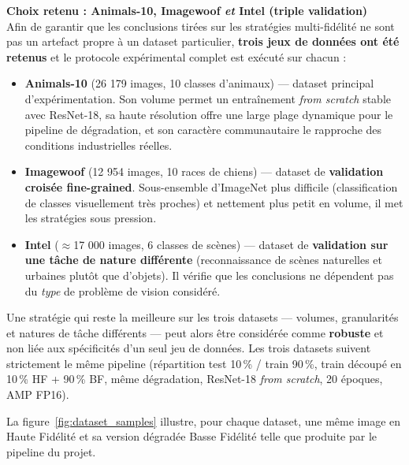 \documentclass[11pt,a4paper,openany]{book}
\begin{document}
\vspace{0.8em}
\begin{decisionbox}
  \textbf{\color{primary}Choix retenu : Animals-10, Imagewoof \emph{et} Intel (triple validation)} \\[3pt]
  Afin de garantir que les conclusions tirées sur les stratégies multi-fidélité ne sont pas un artefact propre à un dataset particulier, \textbf{trois jeux de données ont été retenus} et le protocole expérimental complet est exécuté sur chacun :
  \begin{itemize}
    \item \textbf{Animals-10} (26 179 images, 10 classes d'animaux) — dataset principal d'expérimentation. Son volume permet un entraînement \textit{from scratch} stable avec ResNet-18, sa haute résolution offre une large plage dynamique pour le pipeline de dégradation, et son caractère communautaire le rapproche des conditions industrielles réelles.
    \item \textbf{Imagewoof} (12 954 images, 10 races de chiens) — dataset de \textbf{validation croisée fine-grained}. Sous-ensemble d'ImageNet plus difficile (classification de classes visuellement très proches) et nettement plus petit en volume, il met les stratégies sous pression.
    \item \textbf{Intel} ($\approx$17 000 images, 6 classes de scènes) — dataset de \textbf{validation sur une tâche de nature différente} (reconnaissance de scènes naturelles et urbaines plutôt que d'objets). Il vérifie que les conclusions ne dépendent pas du \emph{type} de problème de vision considéré.
  \end{itemize}
  Une stratégie qui reste la meilleure sur les trois datasets — volumes, granularités et natures de tâche différents — peut alors être considérée comme \textbf{robuste} et non liée aux spécificités d'un seul jeu de données. Les trois datasets suivent strictement le même pipeline (répartition test 10\,\% / train 90\,\%, train découpé en 10\,\% HF + 90\,\% BF, même dégradation, ResNet-18 \textit{from scratch}, 20 époques, AMP FP16).
\end{decisionbox}

La figure~\ref{fig:dataset_samples} illustre, pour chaque dataset, une même image en Haute Fidélité et sa version dégradée Basse Fidélité telle que produite par le pipeline du projet.
\end{document}

